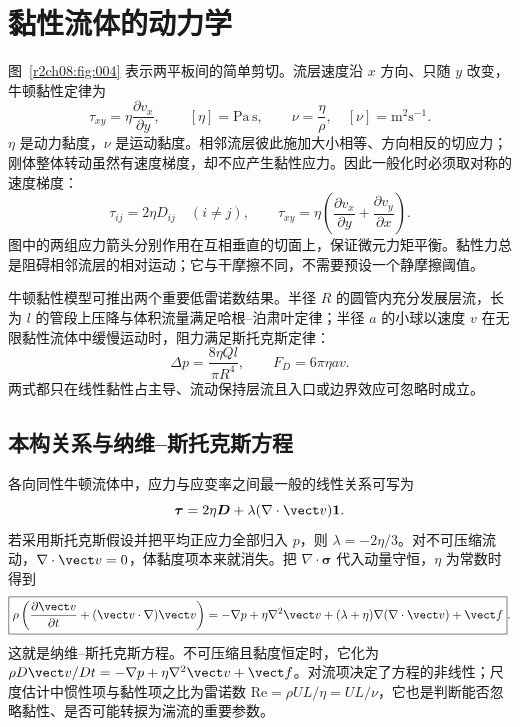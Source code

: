 \section{黏性流体的动力学}
\label{r2ch08:sec:viscous}

图~\ref{r2ch08:fig:004} 表示两平板间的简单剪切。流层速度沿 $x$ 方向、只随 $y$ 改变，牛顿黏性定律为
\begin{equation}
 \tau_{xy}=\eta\frac{\partial v_x}{\partial y},
 \qquad [\eta]=\mathrm{Pa\,s},
 \qquad \nu=\frac\eta\rho,\quad [\nu]=\mathrm{m^2s^{-1}}.
 \label{r2ch08:eq:015}
\end{equation}
$\eta$ 是动力黏度，$\nu$ 是运动黏度。相邻流层彼此施加大小相等、方向相反的切应力；刚体整体转动虽然有速度梯度，却不应产生黏性应力。因此一般化时必须取对称的速度梯度：
\begin{equation}
 \tau_{ij}=2\eta D_{ij}\quad(i\ne j),
 \qquad
 \tau_{xy}=\eta\left(\frac{\partial v_x}{\partial y}+\frac{\partial v_y}{\partial x}\right).
 \label{r2ch08:eq:016}
\end{equation}
图中的两组应力箭头分别作用在互相垂直的切面上，保证微元力矩平衡。黏性力总是阻碍相邻流层的相对运动；它与干摩擦不同，不需要预设一个静摩擦阈值。
\figNewtonViscosity

牛顿黏性模型可推出两个重要低雷诺数结果。半径 $R$ 的圆管内充分发展层流，长为 $l$ 的管段上压降与体积流量满足哈根--泊肃叶定律；半径 $a$ 的小球以速度 $v$ 在无限黏性流体中缓慢运动时，阻力满足斯托克斯定律：
\begin{equation}
 \Delta p=\frac{8\eta Ql}{\pi R^4},
 \qquad F_D=6\pi\eta av.
 \label{r2ch08:eq:017}
\end{equation}
两式都只在线性黏性占主导、流动保持层流且入口或边界效应可忽略时成立。

\subsection{本构关系与纳维--斯托克斯方程}
\label{r2ch08:subsec:navier}

各向同性牛顿流体中，应力与应变率之间最一般的线性关系可写为
\begin{equation}
 \boldsymbol\tau=2\eta\boldsymbol D+\lambda(\nabla\cdot\vect v)\boldsymbol 1.
 \label{r2ch08:eq:018}
\end{equation}
若采用斯托克斯假设并把平均正应力全部归入 $p$，则 $\lambda=-2\eta/3$。对不可压缩流动，$\nabla\cdot\vect v=0$，体黏度项本来就消失。把 $\nabla\cdot\boldsymbol\sigma$ 代入动量守恒，$\eta$ 为常数时得到
\begin{equation}
 \boxed{\rho\left(\frac{\partial\vect v}{\partial t}+(\vect v\cdot\nabla)\vect v\right)
 =-\nabla p+\eta\nabla^2\vect v+(\lambda+\eta)\nabla(\nabla\cdot\vect v)+\vect f}.
 \label{r2ch08:eq:019}
\end{equation}
这就是纳维--斯托克斯方程。不可压缩且黏度恒定时，它化为
$\rho D\vect v/Dt=-\nabla p+\eta\nabla^2\vect v+\vect f$。对流项决定了方程的非线性；尺度估计中惯性项与黏性项之比为雷诺数 $\mathrm{Re}=\rho UL/\eta=UL/\nu$，它也是判断能否忽略黏性、是否可能转捩为湍流的重要参数。
